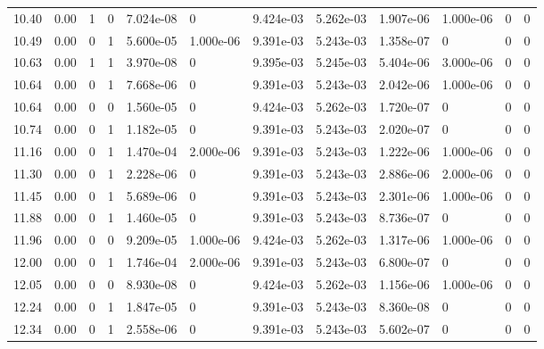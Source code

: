 \documentclass[preview]{standalone}
\begin{document}
{{{\begin{tabular}{L{1.2cm}C{1.2cm} C{0.3cm}C{0.5cm} C{1.4cm}C{1.4cm} C{1.4cm}C{1.4cm} C{1.6cm}C{1.6cm} C{1.6cm}C{1.6cm}}
  10.40  &  0.00  & 1     &  0 &  7.024e-08  & 0  &  9.424e-03&   5.262e-03& 1.907e-06 & 1.000e-06   &  0 & 0  \\ 
  10.49  &  0.00  & 0     &  1 &  5.600e-05  & 1.000e-06  &  9.391e-03&   5.243e-03& 1.358e-07 & 0   &  0 & 0  \\ 
  10.63  &  0.00  & 1     &  1 &  3.970e-08  & 0  &  9.395e-03&   5.245e-03& 5.404e-06 & 3.000e-06   &  0 & 0  \\ 
  10.64  &  0.00  & 0     &  1 &  7.668e-06  & 0  &  9.391e-03&   5.243e-03& 2.042e-06 & 1.000e-06   &  0 & 0  \\ 
  10.64  &  0.00  & 0     &  0 &  1.560e-05  & 0  &  9.424e-03&   5.262e-03& 1.720e-07 & 0   &  0 & 0  \\ 
  10.74  &  0.00  & 0     &  1 &  1.182e-05  & 0  &  9.391e-03&   5.243e-03& 2.020e-07 & 0   &  0 & 0  \\ 
  11.16  &  0.00  & 0     &  1 &  1.470e-04  & 2.000e-06  &  9.391e-03&   5.243e-03& 1.222e-06 & 1.000e-06   &  0 & 0  \\ 
  11.30  &  0.00  & 0     &  1 &  2.228e-06  & 0  &  9.391e-03&   5.243e-03& 2.886e-06 & 2.000e-06   &  0 & 0  \\ 
  11.45  &  0.00  & 0     &  1 &  5.689e-06  & 0  &  9.391e-03&   5.243e-03& 2.301e-06 & 1.000e-06   &  0 & 0  \\ 
  11.88  &  0.00  & 0     &  1 &  1.460e-05  & 0  &  9.391e-03&   5.243e-03& 8.736e-07 & 0   &  0 & 0  \\ 
  11.96  &  0.00  & 0     &  0 &  9.209e-05  & 1.000e-06  &  9.424e-03&   5.262e-03& 1.317e-06 & 1.000e-06   &  0 & 0  \\ 
  12.00  &  0.00  & 0     &  1 &  1.746e-04  & 2.000e-06  &  9.391e-03&   5.243e-03& 6.800e-07 & 0   &  0 & 0  \\ 
  12.05  &  0.00  & 0     &  0 &  8.930e-08  & 0  &  9.424e-03&   5.262e-03& 1.156e-06 & 1.000e-06   &  0 & 0  \\ 
  12.24  &  0.00  & 0     &  1 &  1.847e-05  & 0  &  9.391e-03&   5.243e-03& 8.360e-08 & 0   &  0 & 0  \\ 
  12.34  &  0.00  & 0     &  1 &  2.558e-06  & 0  &  9.391e-03&   5.243e-03& 5.602e-07 & 0   &  0 & 0  \\ 
\hline 
\end{tabular} 

}}}
\end{document}

